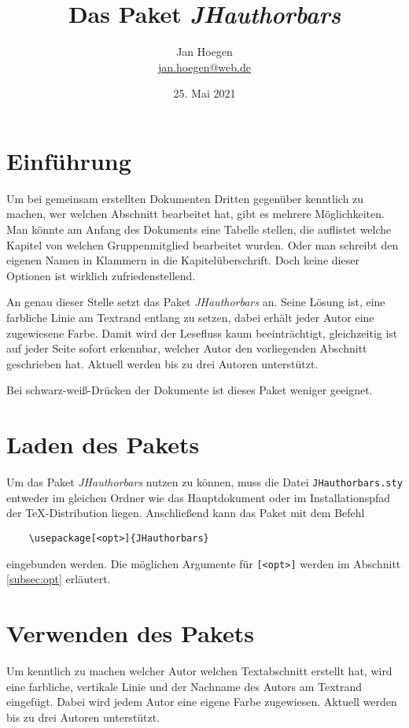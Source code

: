 \documentclass[%
	fontsize=10pt, 
	DIV=8, 
]{scrartcl}
\title{Das Paket \textit{JHauthorbars}}
\author{Jan Hoegen\\\href{mailto:jan.hoegen@web.de}{jan.hoegen@web.de}}
\date{25. Mai 2021}
\begin{document}
\maketitle

\section{Einführung}
Um bei gemeinsam erstellten Dokumenten Dritten gegenüber kenntlich zu machen, wer welchen Abschnitt bearbeitet hat, gibt es mehrere Möglichkeiten. Man könnte am Anfang des Dokuments eine Tabelle stellen, die auflistet welche Kapitel von welchen Gruppenmitglied bearbeitet wurden. Oder man schreibt den eigenen Namen in Klammern in die Kapitelüberschrift. Doch keine dieser Optionen ist wirklich zufriedenstellend. 

An genau dieser Stelle setzt das Paket \textit{JHauthorbars} an. Seine Lösung ist, eine farbliche Linie am Textrand entlang zu setzen, dabei erhält jeder Autor eine zugewiesene Farbe. Damit wird der Lesefluss kaum beeinträchtigt, gleichzeitig ist auf jeder Seite sofort erkennbar, welcher Autor den vorliegenden Abschnitt geschrieben hat. Aktuell werden bis zu drei Autoren unterstützt.

Bei schwarz-weiß-Drücken der Dokumente ist dieses Paket weniger geeignet.

\section{Laden des Pakets}
Um das Paket \textit{JHauthorbars} nutzen zu können, muss die Datei \verb+JHauthorbars.sty+ entweder im gleichen Ordner wie das Hauptdokument oder im Installationspfad der \TeX -Distribution liegen. Anschließend kann das Paket mit dem Befehl
\begin{verbatim}
	\usepackage[<opt>]{JHauthorbars}
\end{verbatim}
eingebunden werden. Die möglichen Argumente für \verb+[<opt>]+ werden im Abschnitt \ref{subsec:opt} erläutert.

\section{Verwenden des Pakets}
Um kenntlich zu machen welcher Autor welchen Textabschnitt erstellt hat, wird eine farbliche, vertikale Linie und der Nachname des Autors am Textrand eingefügt. Dabei wird jedem Autor eine eigene Farbe zugewiesen. Aktuell werden bis zu drei Autoren unterstützt. 
\end{document}

